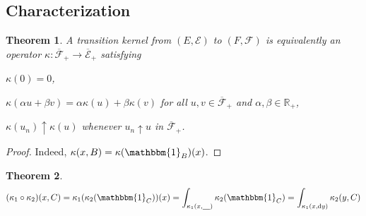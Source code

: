 \documentclass[11pt, a4paper, openany]{book}
\newtheorem{thm}{Theorem}\newtheorem{lem}{Lemma}\newtheorem{crl}{Corollary}
\theoremstyle{definition}
\newcommand{\ph}{\underline{\hspace{0.3cm}}}
\newenvironment{tight_enumerate}{\begin{enumerate}\itemsep -0.2em}{\end{enumerate}}
\begin{document}
\subsection{Characterization}
    \begin{thm}
        A \textit{transition kernel} from $(E,\mathscr{E})$ to $(F,\mathscr{F})$ is equivalently an operator $\kappa:\overline{\mathscr{F}}_+\rightarrow \overline{\mathscr{E}}_+$ satisfying
        \begin{tight_enumerate}
            \item $\kappa(0)=0$,
            \item $\kappa(\alpha u+\beta v)=\alpha \kappa(u)+ \beta \kappa(v)$ for all $u,v\in \overline{\mathscr{F}}_+$ and $\alpha,\beta\in\mathbb{R}_+$,
            \item $\kappa(u_n)\uparrow\kappa(u)$ whenever $u_n\uparrow u$ in $\overline{\mathscr{F}}_+$.
        \end{tight_enumerate}
    \end{thm}
    \begin{proof}
        Indeed, $\kappa(x,B)=\kappa(\mathbbm{1}_B)(x)$.
    \end{proof}
    \begin{thm}
        \[
            (\kappa_1\circ\kappa_2)(x,C)=\kappa_1(\kappa_2(\mathbbm{1}_C))(x)=\int_{\kappa_1(x,\ph)}\kappa_2(\mathbbm{1}_C)=\int_{\kappa_1(x,\odif y)}\kappa_2(y,C)
        \]
    \end{thm}
\end{document}
